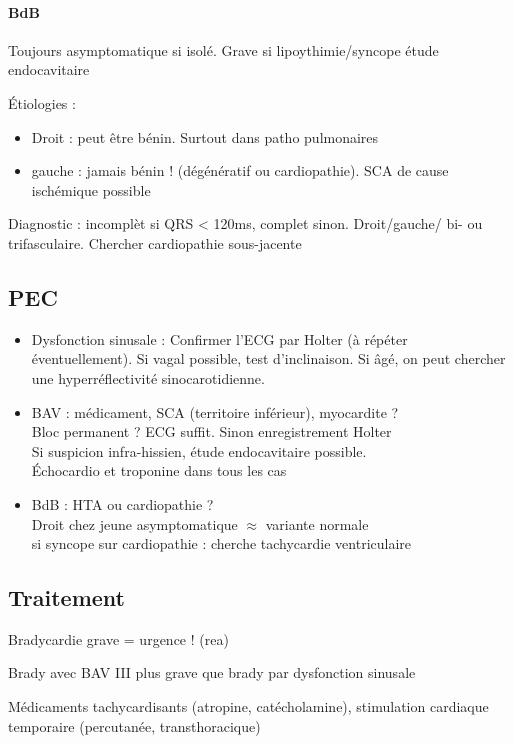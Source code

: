 \documentclass{article}
\begin{document}
\paragraph{BdB}
Toujours asymptomatique si isolé. Grave si lipoythimie/syncope \danger \thus
étude endocavitaire

Étiologies :
\begin{itemize}
  \item Droit : peut être bénin. Surtout dans patho pulmonaires
  \item gauche : jamais bénin ! (dégénératif ou cardiopathie). SCA de cause
    ischémique possible \skull
\end{itemize}

Diagnostic : incomplèt si QRS < 120ms, complet sinon. Droit/gauche/ bi- ou
trifasculaire. Chercher cardiopathie sous-jacente

\subsection{PEC}
\begin{itemize}
  \item 
Dysfonction sinusale : Confirmer l'ECG par Holter (à répéter éventuellement).
Si vagal possible, test d'inclinaison. Si âgé, on peut chercher une
hyperréflectivité sinocarotidienne.
\item BAV : médicament, SCA (territoire inférieur), myocardite ? \\
  Bloc permanent ? ECG suffit. Sinon enregistrement Holter \\
  Si suspicion infra-hissien, étude endocavitaire possible.\\
  Échocardio et troponine dans tous les cas
\item BdB : HTA ou cardiopathie ?\\
  Droit chez jeune asymptomatique $\approx$ variante normale\\
  si syncope sur cardiopathie : cherche tachycardie ventriculaire
\end{itemize}

\subsection{Traitement}
Bradycardie grave = urgence ! (rea) \skull

Brady avec BAV III plus grave que brady par dysfonction sinusale

Médicaments tachycardisants (atropine, catécholamine), stimulation cardiaque
temporaire (percutanée, transthoracique)
\end{document}
